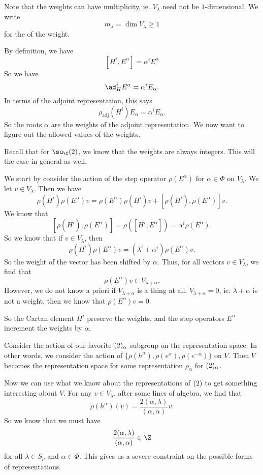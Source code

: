 \documentclass[a4paper]{article}
\begin{document}
Note that the weights can have multiplicity, ie. $V_\lambda$ need not be $1$-dimensional. We write
\[
  m_\lambda = \dim V_\lambda \geq 1
\]
for the  of the weight.

By definition, we have
\[
  [H^i, E^\alpha] = \alpha^i E^\alpha
\]
So we have
\[
  \ad_H^i E^\alpha = \alpha^i E_\alpha.
\]
In terms of the adjoint representation, this says
\[
  \rho_{\mathrm{adj}} (H^i) E_\alpha = \alpha^i E_\alpha.
\]
So the roots $\alpha$ are the weights of the adjoint representation. We now want to figure out the allowed values of the weights.

Recall that for $\su_\C(2)$, we know that the weights are always integers. This will the case in general as well.

We start by consider the action of the step operator $\rho(E^\alpha)$ for $\alpha\in \Phi$ on $V_\lambda$. We let $v \in V_\lambda$. Then we have
\[
  \rho(H^i) \rho(E^\alpha)v = \rho(E^\alpha) \rho(H^i) v + [\rho(H^i), \rho(E^\alpha)] v.
\]
We know that
\[
  [\rho(H^i), \rho(E^\alpha)] = \rho([H^i, E^\alpha]) = \alpha^i \rho(E^\alpha).
\]
So we know that if $v \in V_\lambda$, then
\[
  \rho(H^i)\rho(E^\alpha)v = (\lambda^i + \alpha^i) \rho(E^\alpha) v.
\]
So the weight of the vector has been shifted by $\alpha$. Thus, for all vectors $v \in V_\lambda$, we find that
\[
  \rho(E^\alpha) v \in V_{\lambda + \alpha}.
\]
However, we do not know a priori if $V_{\lambda + \alpha}$ is a thing at all. $V_{\lambda + \alpha} = 0$, ie. $\lambda + \alpha$ is not a weight, then we know that $\rho(E^\alpha) v = 0$.

So the Cartan element $H^i$ preserve the weights, and the step operators $E^\alpha$ increment the weights by $\alpha$.

Consider the action of our favorite $\sl(2)_\alpha$ subgroup on the representation space. In other words, we consider the action of $\{\rho(h^\alpha), \rho(e^\alpha), \rho(e^{-\alpha})\}$ on $V$. Then $V$ becomes the representation space for some representation $\rho_\alpha$ for $\sl(2)_\alpha$.

Now we can use what we know about the representations of $\sl(2)$ to get something interesting about $V$. For any $v \in V_\lambda$, after some lines of algebra, we find that
\[
  \rho(h^\alpha)(v) = \frac{2(\alpha, \lambda)}{(\alpha, \alpha)} v.
\]
So we know that we must have
\[
  \frac{2(\alpha, \lambda)}{(\alpha, \alpha)} \in \Z
\]
for all $\lambda \in S_\rho$ and $\alpha \in \Phi$. This gives us a severe constraint on the possible forms of representations.
\printindex
\end{document}
